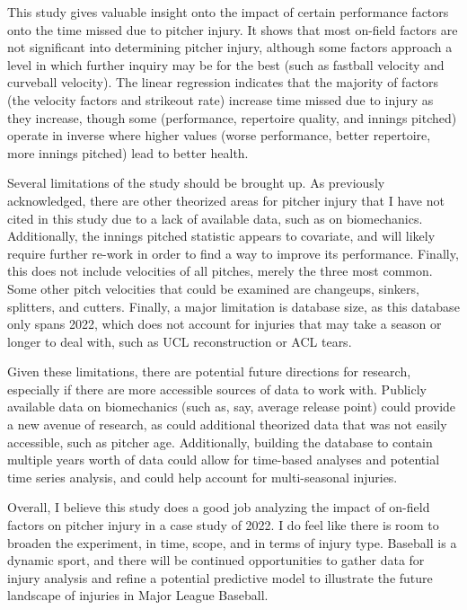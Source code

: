 \documentclass{article}
\begin{document}
This study gives valuable insight onto the impact of certain performance factors onto the time missed due to pitcher injury. It shows that most on-field factors are not significant into determining pitcher injury, although some factors approach a level in which further inquiry may be for the best (such as fastball velocity and curveball velocity). The linear regression indicates that the majority of factors (the velocity factors and strikeout rate) increase time missed due to injury as they increase, though some (performance, repertoire quality, and innings pitched) operate in inverse where higher values (worse performance, better repertoire, more innings pitched) lead to better health.

Several limitations of the study should be brought up. As previously acknowledged, there are other theorized areas for pitcher injury that I have not cited in this study due to a lack of available data, such as on biomechanics. Additionally, the innings pitched statistic appears to covariate, and will likely require further re-work in order to find a way to improve its performance. Finally, this does not include velocities of all pitches, merely the three most common. Some other pitch velocities that could be examined are changeups, sinkers, splitters, and cutters. Finally, a major limitation is database size, as this database only spans 2022, which does not account for injuries that may take a season or longer to deal with, such as UCL reconstruction or ACL tears. 

Given these limitations, there are potential future directions for research, especially if there are more accessible sources of data to work with. Publicly available data on biomechanics (such as, say, average release point) could provide a new avenue of research, as could additional theorized data that was not easily accessible, such as pitcher age. Additionally, building the database to contain multiple years worth of data could allow for time-based analyses and potential time series analysis, and could help account for multi-seasonal injuries. 

Overall, I believe this study does a good job analyzing the impact of on-field factors on pitcher injury in a case study of 2022. I do feel like there is room to broaden the experiment, in time, scope, and in terms of injury type. Baseball is a dynamic sport, and there will be continued opportunities to gather data for injury analysis and refine a potential predictive model to illustrate the future landscape of injuries in Major League Baseball.



\end{document}
